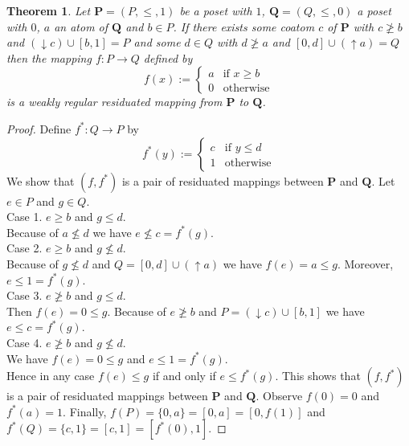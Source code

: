 \documentclass[12pt]{article}
\newtheorem{theorem}{Theorem}[section]
\begin{document}
\begin{theorem}
Let $\mathbf P=(P,\le,1)$ be a poset with $1$, $\mathbf Q=(Q,\le,0)$ a poset with $0$, $a$ an atom of $\mathbf Q$ and $b\in P$. If there exists some coatom $c$ of $\mathbf P$ with $c\not\ge b$ and $(\downarrow c)\cup[b,1]=P$ and some $d\in Q$ with $d\not\ge a$ and $[0,d]\cup(\uparrow a)=Q$ then the mapping $f\colon P\to Q$ defined by
\[
f(x):=\left\{
\begin{array}{ll}
a & \text{if }x\ge b \\
0 & \text{otherwise}
\end{array}
\right.
\]
is a weakly regular residuated mapping from $\mathbf P$ to $\mathbf Q$.
\end{theorem}

\begin{proof}
Define $f^*\colon Q\to P$ by
\[
f^*(y):=\left\{
\begin{array}{ll}
c & \text{if }y\le d \\
1 & \text{otherwise}
\end{array}
\right.
\]
We show that $(f,f^*)$ is a pair of residuated mappings between $\mathbf P$ and $\mathbf Q$. Let $e\in P$ and $g\in Q$. \\
Case 1. $e\ge b$ and $g\le d$. \\
Because of $a\not\le d$ we have $e\not\le c=f^*(g)$. \\
Case 2. $e\ge b$ and $g\not\le d$. \\
Because of $g\not\le d$ and $Q=[0,d]\cup(\uparrow a)$ we have $f(e)=a\le g$. Moreover, $e\le1=f^*(g)$. \\
Case 3. $e\not\ge b$ and $g\le d$. \\
Then $f(e)=0\le g$. Because of $e\not\ge b$ and $P=(\downarrow c)\cup[b,1]$ we have $e\le c=f^*(g)$. \\
Case 4. $e\not\ge b$ and $g\not\le d$. \\
We have $f(e)=0\le g$ and $e\le1=f^*(g)$. \\
Hence in any case $f(e)\le g$ if and only if $e\le f^*(g)$. This shows that $(f,f^*)$ is a pair of residuated mappings between $\mathbf P$ and $\mathbf Q$. Observe $f(0)=0$ and $f^*(a)=1$. Finally, $f(P)=\{0,a\}=[0,a]=[0,f(1)]$ and $f^*(Q)=\{c,1\}=[c,1]=[f^*(0),1]$.
\end{proof}
\end{document}
